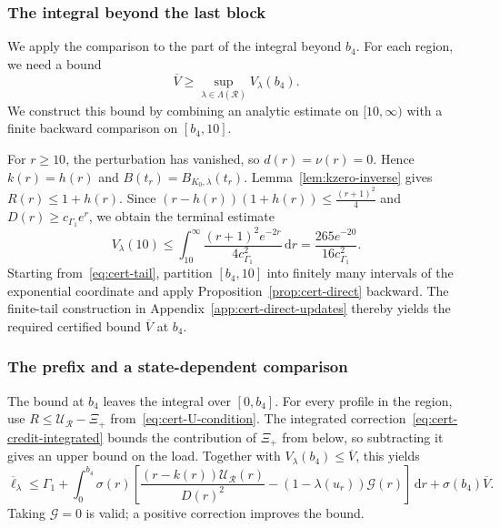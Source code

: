 \documentclass[11pt]{article}
\theoremstyle{definition}
\theoremstyle{remark}
\newcommand{\dd}{\,\mathrm d}
\begin{document}
\subsubsection{The integral beyond the last block}
\label{app:cert-tail-bound}

We apply the comparison to the part of the integral beyond $b_4$.
For each region, we need a bound
\[
 \overline V\ge
 \sup_{\lambda\in\Lambda(\mathcal R)}V_\lambda(b_4).
\]
We construct this bound by combining an analytic estimate on
$[10,\infty)$ with a finite backward comparison on $[b_4,10]$.

For $r\ge10$, the perturbation has vanished, so
$d(r)=\nu(r)=0$.  Hence $k(r)=h(r)$ and $B(t_r)=B_{K_0,\lambda}(t_r)$.
Lemma~\ref{lem:kzero-inverse} gives $R(r)\le1+h(r)$.  Since
$
 (r-h(r))(1+h(r))\le\frac{(r+1)^2}{4}$
 and $
 D(r)\ge c_{\Gamma_1} e^r$,
we obtain the terminal estimate
\begin{equation}\label{eq:cert-tail}
 V_\lambda(10)
 \le
 \int_{10}^\infty
 \frac{(r+1)^2e^{-2r}}{4c_{\Gamma_1}^2}\dd r
 =
 \frac{265e^{-20}}{16c_{\Gamma_1}^2}.
\end{equation}
Starting from~\eqref{eq:cert-tail}, partition $[b_4,10]$ into finitely
many intervals of the exponential coordinate and apply
Proposition~\ref{prop:cert-direct} backward.  The finite-tail construction in
Appendix~\ref{app:cert-direct-updates} thereby yields the required
certified bound $\overline V$ at $b_4$.


\subsubsection{The prefix and a state-dependent comparison}

The bound at $b_4$ leaves the integral over $[0,b_4]$.
For every profile in the region, use
$R\le\mathcal U_{\mathcal R}-\Xi_+$ from~\eqref{eq:cert-U-condition}.
The integrated correction~\eqref{eq:cert-credit-integrated} bounds
the contribution of $\Xi_+$ from below, so subtracting it gives an
upper bound on the load.  Together with
$V_\lambda(b_4)\le\overline V$, this yields
\begin{equation}\label{eq:cert-prefix-main}
 \overline\ell_\lambda
 \le\Gamma_1+
 \int_0^{b_4}\sigma(r)
 \left[
 \frac{(r-k(r))\mathcal U_{\mathcal R}(r)}{D(r)^2}
 -(1-\lambda(u_r))\mathcal G(r)
 \right]\dd r
 +\sigma(b_4)\overline V.
\end{equation}
Taking $\mathcal G=0$ is valid; a positive correction improves the bound.
\end{document}
